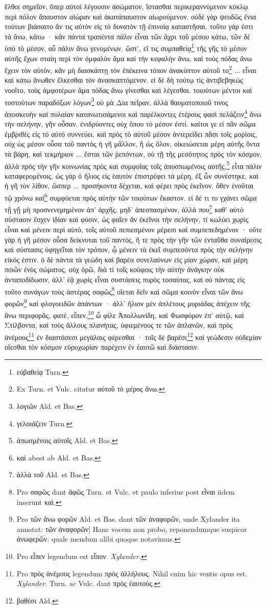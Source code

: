 \documentclass[a4paper, 11pt, oneside, polutonikogreek, german]{article}
\begin{document}
ἔλθοι σημεῖον, ὅπερ αὐτοὶ λέγουσιν ἀσώματον, ἵστασθαι περικεραννύμενον κύκλῳ περὶ πόλον ἄπαυστον αἰώραν καὶ ἀκατάπαυστον αἰωρούμενον. οὐδὲ γὰρ ψευδῶς ἔνια τούτων βιάσαιτο ἄν τις αὐτὸν εἰς τὸ δυνατὸν τῇ ἐπινοίᾳ καταστῆσαι. τοῦτο γάρ ἐστι τὰ ἄνω, κάτω · κἂν πάντα τραπέντα πάλιν εἶναι τῶν ἄχρι τοῦ μέσου κάτω, τῶν δὲ ὑπὸ τὸ μέσον, αὖ πάλιν ἄνω γενομένων. ὥστ', εἴ τις συμπαθείᾳ\footnote{εὐβαθείᾳ Turn.} τῆς γῆς τὸ μέσον αὐτῆς ἔχων σταίη περὶ τὸν ὀμφαλὸν ἅμα καὶ τὴν κεφαλὴν ἄνω, καὶ τοὺς πόδας ἄνω ἔχειν τὸν αὐτὸν, κἂν μὴ διασκάπτῃ τὸν ἐπέκεινα τόπον ἀνακύπτον αὐτοῦ το\footnote{Ex Turn. et Vulc. citatur αὐτοῦ τὸ μέρος ἄνω.} ... εἶναι καὶ κάτω ἄνωθεν ἕλκεσθαι τὸν ἀνασκαπτόμενον. εἰ δὲ δὴ τούτῳ τὶς ἀντιβεβηκὼς νοοῖτο, τοὺς ἀμφοτέρων ἅμα πόδας ἄνω γίνεσθαι καὶ λέγεσθαι. τοιούτων μέντοι καὶ τοστούτων παραδόξων λόγων\footnote{λογιῶν Ald. et Bas.} οὐ μὰ Δία πεῖραν, ἀλλὰ θαυματοποιοῦ τινος ἀποσκευὴν καὶ πυλαίαν κατανωτισάμενοι καὶ παρέλκοντες ἑτέρους φασὶ πελάζειν\footnote{γελοιάζειν Turn.} ἄνω τὴν σελήνην, γῆν οὖσαν, ἐνιδρύοντες οὐχ ὅπου τὸ μέσον ἐστί. καίτοι γε εἰ πᾶν σῶμα ἐμβριθὲς εἰς τὸ αὐτὸ συννεύει, καὶ πρὸς τὸ αὐτοῦ μέσον ἀντερείδει πᾶσι τοῖς μορίοις, οὐχ ὡς μέσον οὖσα τοῦ παντὸς ἡ γῆ μᾶλλον, ἢ ὡς ὅλον, οἰκειώσεται μέρη αὐτῆς ὄντα τὰ βάρη, καὶ τεκμήριον ... ἔσται τῶν ῥεπόντων, οὐ τῇ τῆς μεσότητος πρὸς τὸν κόσμον, ἀλλὰ πρὸς τὴν γῆν κοινωνίας πρὸς καὶ συμφυΐας τοῖς ἀποσπωμένοις αὐτῆς,\footnote{ἀπωσμένοις αὐτοῖς Ald. et Bas.} εἶτα πάλιν καταφερομένοις. ὡς γὰρ ὁ ἥλιος εἰς ἑαυτὸν ἐπιστρέφει τὰ μέρη, ἐξ ὧν συνέστηκε, καὶ ἡ γῆ τὸν λίθον, ὥσπερ ... προσήκοντα δέχεται, καὶ φέρει πρὸς ἐκεῖνον. ὅθεν ἑνοῦται τῷ χρόνω καὶ\footnote{καὶ abest ab Ald. et Bas.} συμφύεται πρὸς αὐτὴν τῶν τοιούτων ἕκαστον. εἰ δέ τι τυ γχάνει σῶμα τῇ γῇ μὴ προσνενεμημένον ἀπ' ἀρχῆς, μηδ' ἀπεσπασμένον, ἀλλά που\footnote{ἀλλὰ τοῦ Ald. et Bas.} καθ' αὑτὸ σύστασιν ἔσχεν ἰδίαν καὶ φύσιν, ὡς φαῖεν ἂν ἐκεῖνοι τὴν σελήνην, τί κωλύει χωρὶς εἶναι καὶ μένειν περὶ αὐτὸ, τοῖς αὐτοῦ πεπιεσμένον μέρεσι καὶ συμπεπεδημένον · οὔτε γὰρ ἡ γῆ μέσον οὖσα δείκνυται τοῦ παντὸς, ἥ τε πρὸς τὴν γῆν τῶν ἐνταῦθα συναίρεσις καὶ σύστασις ὑφηγεῖται τὸν τρόπον, ᾧ μένειν τὰ ἐκεῖ συμπεσόντα πρὸς τὴν σελήνην εἰκός ἐστιν. ὁ δὲ πάντα τὰ γεώδη καὶ βαρέα συνελαύνων εἰς μίαν χώραν, καὶ μέρη ποιῶν ἑνὸς σώματος, οὐχ ὁρῶ, διὰ τί τοῖς κούφοις τὴν αὐτὴν ἀνάγκην οὐκ ἀνταποδίδωσιν, ἀλλ' ἐᾷ χωρὶς εἶναι συστάσεις πυρὸς τοσαύτας, καὶ οὐ πάντας εἰς τοῦτο συνάγων τοὺς ἀστέρας σαφῶς\footnote{Pro σαφῶς dant ἃφῶς Turn. et Vulc. et paulo inferius post εἶναι iidem inserunt καὶ.} οἴεται δεῖν καὶ σῶμα κοινὸν εἶναι τῶν ἄνω φορῶν\footnote{Pro τῶν ἄνω φορῶν Ald. et Bas. dant τῶν ἀναφορῶν, unde Xylander ita annotat: τῶν ἀναφορῶν] Hanc vocem non probo, reponendumque suspicor ἀνωφερῶν: quale mendum alibi quoque notavimus.} καὶ φλογοειδῶν ἁπάντων · ἀλλ' ἥλιον μὲν ἀπλέτους μυριάδας ἀπέχειν τῆς ἄνω περιφορᾶς, φατὲ, εἶπεν,\footnote{Pro εἶπεν legendum est εἶπον. \emph{Xylander.}} ὦ φίλε Ἀπολλωνίδη, καὶ Φωσφόρον ἐπ' αὐτῷ, καὶ Στίλβοντα, καὶ τοὺς ἄλλους πλανήτας, ὑφιεμένους τε τῶν ἀπλανῶν, καὶ πρὸς ἀνέμους\footnote{Pro πρὸς ἀνέμους legendum πρὸς ἀλλήλους. Nihil enim hic ventis opus est. \emph{Xylander.} Turn. ac Vulc. dant πρὸς ἑαυτοὺς.} ἐν διαστάσεσι μεγάλαις φέρεσθαι · τοῖς δὲ βαρέσι\footnote{βαθέσι Ald.} καὶ γεώδεσιν οὐδεμίαν οἴεσθαι τὸν κόσμον εὐρυχωρίαν παρέχειν ἐν ἑαυτῶ καὶ διάστασιν. 
\end{document}
